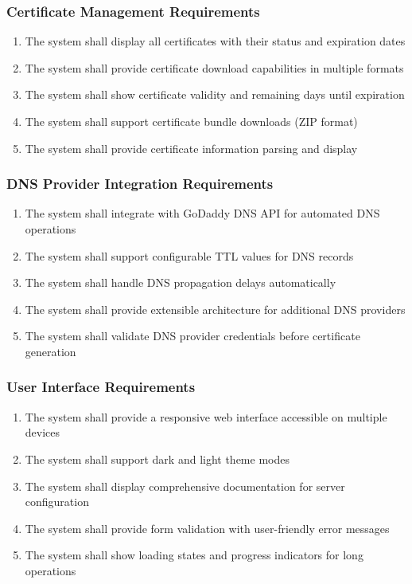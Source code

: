 \subsubsection{Certificate Management Requirements}
\begin{enumerate}
    \item The system shall display all certificates with their status and expiration dates
    \item The system shall provide certificate download capabilities in multiple formats
    \item The system shall show certificate validity and remaining days until expiration
    \item The system shall support certificate bundle downloads (ZIP format)
    \item The system shall provide certificate information parsing and display
\end{enumerate}

\subsubsection{DNS Provider Integration Requirements}
\begin{enumerate}
    \item The system shall integrate with GoDaddy DNS API for automated DNS operations
    \item The system shall support configurable TTL values for DNS records
    \item The system shall handle DNS propagation delays automatically
    \item The system shall provide extensible architecture for additional DNS providers
    \item The system shall validate DNS provider credentials before certificate generation
\end{enumerate}

\subsubsection{User Interface Requirements}
\begin{enumerate}
    \item The system shall provide a responsive web interface accessible on multiple devices
    \item The system shall support dark and light theme modes
    \item The system shall display comprehensive documentation for server configuration
    \item The system shall provide form validation with user-friendly error messages
    \item The system shall show loading states and progress indicators for long operations
\end{enumerate}

